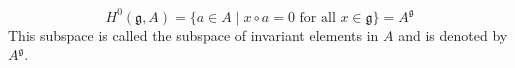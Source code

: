 $$H^0(\mathfrak{g}, A) = \{a \in A \mid x \circ a = 0 \text{ for all } x \in \mathfrak{g}\} = A^{\mathfrak{g}}$$
This subspace is called the subspace of invariant elements in $A$ and is denoted by $A^{\mathfrak{g}}$.
